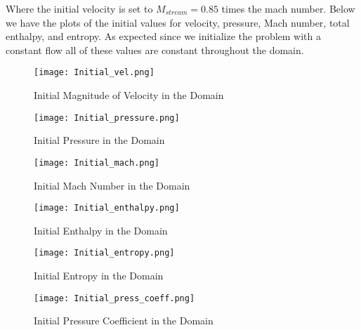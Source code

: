\documentclass[a4paper,12pt,titlepage]{article}
\newcommand{\scale}{0.5}
\begin{document}
Where the initial velocity is set to $M_{stream} = 0.85$ times the mach number.  Below we have the plots of the initial values for velocity, pressure, Mach number, total enthalpy, and entropy.  As expected since we initialize the problem with a constant flow all of these values are constant throughout the domain.

\begin{figure}[H]
  \begin{center}
    \texttt{[image: Initial\_vel.png]}
    \caption{Initial Magnitude of Velocity in the Domain}
  \end{center}
\end{figure}
  
\begin{figure}[H]
  \begin{center}
    \texttt{[image: Initial\_pressure.png]}
    \caption{Initial Pressure in the Domain}
  \end{center}
\end{figure}

\begin{figure}[H]
  \begin{center}
    \texttt{[image: Initial\_mach.png]}
    \caption{Initial Mach Number in the Domain}
  \end{center}
\end{figure}

\begin{figure}[H]
  \begin{center}
    \texttt{[image: Initial\_enthalpy.png]}
    \caption{Initial Enthalpy in the Domain}
  \end{center}
\end{figure}

\begin{figure}[H]
  \begin{center}
    \texttt{[image: Initial\_entropy.png]}
    \caption{Initial Entropy in the Domain}
  \end{center}
\end{figure}

\begin{figure}[H]
  \begin{center}
    \texttt{[image: Initial\_press\_coeff.png]}
    \caption{Initial Pressure Coefficient in the Domain}
  \end{center}
\end{figure}
\end{document}
